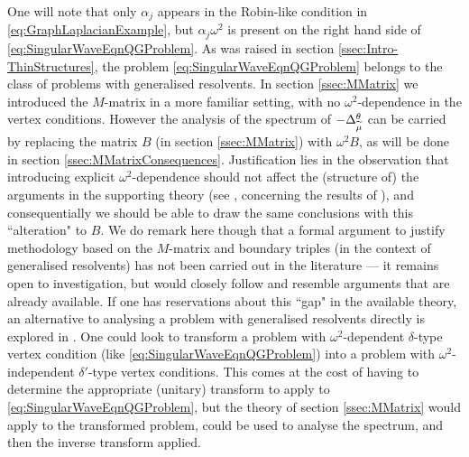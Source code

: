 One will note that only $\alpha_j$ appears in the Robin-like condition in \eqref{eq:GraphLaplacianExample}, but $\alpha_j\omega^2$ is present on the right hand side of \eqref{eq:SingularWaveEqnQGProblem}.
As was raised in section \ref{ssec:Intro-ThinStructures}, the problem \eqref{eq:SingularWaveEqnQGProblem} belongs to the class of problems with generalised resolvents.
In section \ref{ssec:MMatrix} we introduced the $M$-matrix in a more familiar setting, with no $\omega^2$-dependence in the vertex conditions.
However the analysis of the spectrum of $-\Delta_{\widetilde{\mu}}^{\theta}$ can be carried by replacing the matrix $B$ (in section \ref{ssec:MMatrix}) with $\omega^2 B$, as will be done in section \ref{ssec:MMatrixConsequences}.
Justification lies in the observation that introducing explicit $\omega^2$-dependence should not affect the (structure of) the arguments in the supporting theory (see \cite[page 1846]{cherednichenko2018effective}, concerning the results of \cite{ryzhov2009weyl} ), and consequentially we should be able to draw the same conclusions with this ``alteration" to $B$.
We do remark here though that a formal argument to justify methodology based on the $M$-matrix and boundary triples (in the context of generalised resolvents) has not been carried out in the literature --- it remains open to investigation, but would closely follow and resemble arguments that are already available.
If one has reservations about this ``gap" in the available theory, an alternative to analysing a problem with generalised resolvents directly is explored in \cite[Section 6]{cherednichenko2017norm}.
One could look to transform a problem with $\omega^2$-dependent $\delta$-type vertex condition (like \eqref{eq:SingularWaveEqnQGProblem}) into a problem with $\omega^2$-independent $\delta'$-type vertex conditions.
This comes at the cost of having to determine the appropriate (unitary) transform to apply to \eqref{eq:SingularWaveEqnQGProblem}, but the theory of section \ref{ssec:MMatrix} would apply to the transformed problem, could be used to analyse the spectrum, and then the inverse transform applied.

